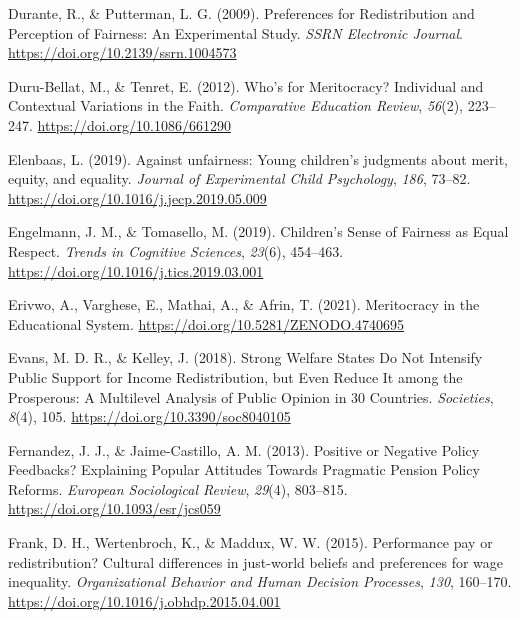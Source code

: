 \documentclass[
  letterpaper,
  DIV=11,
  numbers=noendperiod]{scrartcl}
\newlength{\cslhangindent}
\newlength{\cslentryspacingunit} %
\newenvironment{CSLReferences}[2] %
 {%
  \setlength{\parindent}{0pt}
  \ifodd #1
  \let\oldpar\par
  \def\par{\hangindent=\cslhangindent\oldpar}
  \fi
  \setlength{\parskip}{#2\cslentryspacingunit}
 }%
 {}
\begin{document}
\begin{CSLReferences}{1}{0}
\leavevmode{}%
Durante, R., \& Putterman, L. G. (2009). Preferences for
{Redistribution} and {Perception} of {Fairness}: {An Experimental
Study}. \emph{SSRN Electronic Journal}.
\url{https://doi.org/10.2139/ssrn.1004573}

\leavevmode{}%
Duru-Bellat, M., \& Tenret, E. (2012). Who's for {Meritocracy}?
{Individual} and {Contextual Variations} in the {Faith}.
\emph{Comparative Education Review}, \emph{56}(2), 223--247.
\url{https://doi.org/10.1086/661290}

\leavevmode{}%
Elenbaas, L. (2019). Against unfairness: {Young} children's judgments
about merit, equity, and equality. \emph{Journal of Experimental Child
Psychology}, \emph{186}, 73--82.
\url{https://doi.org/10.1016/j.jecp.2019.05.009}

\leavevmode{}%
Engelmann, J. M., \& Tomasello, M. (2019). Children's {Sense} of
{Fairness} as {Equal Respect}. \emph{Trends in Cognitive Sciences},
\emph{23}(6), 454--463. \url{https://doi.org/10.1016/j.tics.2019.03.001}

\leavevmode{}%
Erivwo, A., Varghese, E., Mathai, A., \& Afrin, T. (2021). Meritocracy
in the {Educational System}.
\url{https://doi.org/10.5281/ZENODO.4740695}

\leavevmode{}%
Evans, M. D. R., \& Kelley, J. (2018). Strong {Welfare States Do Not
Intensify Public Support} for {Income Redistribution}, but {Even Reduce
It} among the {Prosperous}: {A Multilevel Analysis} of {Public Opinion}
in 30 {Countries}. \emph{Societies}, \emph{8}(4), 105.
\url{https://doi.org/10.3390/soc8040105}

\leavevmode{}%
Fernandez, J. J., \& Jaime-Castillo, A. M. (2013). Positive or {Negative
Policy Feedbacks}? {Explaining Popular Attitudes Towards Pragmatic
Pension Policy Reforms}. \emph{European Sociological Review},
\emph{29}(4), 803--815. \url{https://doi.org/10.1093/esr/jcs059}

\leavevmode{}%
Frank, D. H., Wertenbroch, K., \& Maddux, W. W. (2015). Performance pay
or redistribution? {Cultural} differences in just-world beliefs and
preferences for wage inequality. \emph{Organizational Behavior and Human
Decision Processes}, \emph{130}, 160--170.
\url{https://doi.org/10.1016/j.obhdp.2015.04.001}


\end{CSLReferences}
\end{document}
